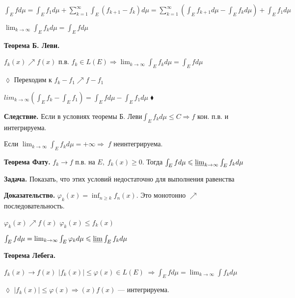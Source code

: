 $\int_E f d\mu = \int_E f_1 d \mu + \sum_{k=1}^{\infty} \int_E
(f_{k+1} - f_k) d \mu = \sum_{k=1}^{\infty}(\int_E f_{k+1} d \mu -
\int_E f_k d \mu) + \int_E f_1 d \mu$

%
%
%
%
%
%
%
%
%
%
%
%

$\lim_{k \rightarrow \infty} \int_E f_k d \mu = \int_E f d \mu$

\textbf{Теорема Б. Леви.} \quad

$f_k(x) \nearrow f(x)$ п.в. $f_k \in L(E) \Rightarrow \lim_{k
\rightarrow \infty} \int_E f_k d \mu = \int_E f d \mu$

$\lozenge$ Переходим к $f_k - f_1 \nearrow f - f_1$

$lim_{k \rightarrow \infty} (\int_E f_k - \int_E f_1) = \int_E f d
\mu - \int_E f_1 d \mu$ $\blacklozenge$


\textbf{Следствие.} \quad Если в условиях теоремы Б. Леви$\int_E
f_k d \mu \leqslant C \Rightarrow f$ кон. п.в. и интегрируема.

Если $\lim_{k \rightarrow \infty} \int_E f_k d \mu = + \infty
\Rightarrow \; f$ неинтегрируема.

\textbf{Теорема Фату.} \quad  $f_k \rightarrow f$ п.в. на $E, \;
f_k(x) \geqslant 0$. Тогда $\int_E f d \mu \leqslant \varliminf_{k
\rightarrow \infty} \int_E f_k d \mu$

\textbf{Задача.} \quad Показать, что этих условий недостаточно для
выполнения равенства

\textbf{Доказательство.} \quad $\varphi_k (x) = \inf_{n \geqslant
k} f_n (x)$. Это монотонно $\nearrow$ последовательность.

$\varphi_k(x) \nearrow f(x)$ $\varphi_k(x) \leqslant f_k(x)$

$\int_E f d \mu = \lim_{k \rightarrow \infty} \int_E \varphi_k d
\mu \leqslant \varliminf \int_E f_k d \mu$

\textbf{Теорема Лебега.} \quad

$f_k(x) \longrightarrow f(x) $ $|f_k(x)| \leqslant \varphi(x) \in
L(E) \; \Rightarrow \int_E f d \mu = \lim_{k \rightarrow \infty}
\int f_k d \mu$

$\lozenge$ $|f_k(x)| \leqslant \varphi(x) \Rightarrow(x) f(x)$ ---
интегрируема.

